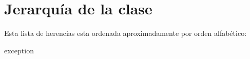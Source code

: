 \section{Jerarquía de la clase}
Esta lista de herencias esta ordenada aproximadamente por orden alfabético\+:\begin{DoxyCompactList}
\item {}
\item exception\begin{DoxyCompactList}
\item {}
\end{DoxyCompactList}
\item {}
\item {}
\end{DoxyCompactList}
